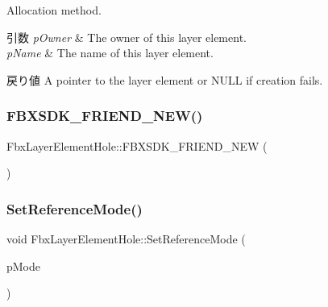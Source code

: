 Allocation method. 
\begin{DoxyParams}{引数}
{\em p\+Owner} & The owner of this layer element. \\
\hline
{\em p\+Name} & The name of this layer element. \\
\hline
\end{DoxyParams}
\begin{DoxyReturn}{戻り値}
A pointer to the layer element or {\ttfamily N\+U\+LL} if creation fails. 
\end{DoxyReturn}
\mbox{\label{class_fbx_layer_element_hole_a7180216993dbbb96cb3edbe3d2db5fa4}} 
\subsubsection{\texorpdfstring{F\+B\+X\+S\+D\+K\+\_\+\+F\+R\+I\+E\+N\+D\+\_\+\+N\+E\+W()}{FBXSDK\_FRIEND\_NEW()}}
{\footnotesize\ttfamily Fbx\+Layer\+Element\+Hole\+::\+F\+B\+X\+S\+D\+K\+\_\+\+F\+R\+I\+E\+N\+D\+\_\+\+N\+EW (\begin{DoxyParamCaption}{ }\end{DoxyParamCaption})}

\mbox{\label{class_fbx_layer_element_hole_a496cc8811acb175197b76226f118149c}} 
\subsubsection{\texorpdfstring{Set\+Reference\+Mode()}{SetReferenceMode()}}
{\footnotesize\ttfamily void Fbx\+Layer\+Element\+Hole\+::\+Set\+Reference\+Mode (\begin{DoxyParamCaption}\item[{\hyperlink{class_fbx_layer_element_a00f04654580ca9b2f5d292c11abd83fc}{Fbx\+Layer\+Element\+::\+E\+Reference\+Mode}}]{p\+Mode }\end{DoxyParamCaption})\hspace{0.3cm}{\ttfamily [inline]}}

